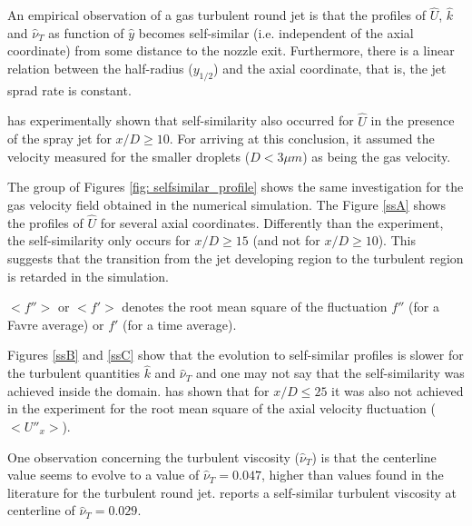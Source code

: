 An empirical observation of a gas turbulent round jet is that the profiles of $\hat{U}$, $\hat{k}$ and $\hat{\nu}_T$ as function of $\hat{y}$ becomes self-similar (i.e. independent of the axial coordinate) from some distance to the nozzle exit.
Furthermore, there is a linear relation between the half-radius ($y_{1/2}$) and the axial coordinate, that is, the jet sprad rate is constant.

\cite{chen} has experimentally shown that self-similarity also occurred for $\hat{U}$ in the presence of the spray jet for $x/D \ge 10$. For arriving at this conclusion, it assumed the velocity measured for the smaller droplets ($D<3\mu m$) as being the gas velocity. 

The group of Figures \ref{fig: selfsimilar_profile} shows the same investigation for the gas velocity field obtained in the numerical simulation. The Figure \ref{ssA} shows the profiles of $\hat{U}$ for several axial coordinates. Differently than the experiment, the self-similarity only occurs for $x/D \ge 15$ (and not for $x/D \ge 10$). This suggests that the transition from the jet developing region to the turbulent region is retarded in the simulation.

\begin{notation}
$<f''>$ or $<f'>$ denotes the root mean square of the fluctuation $f''$ (for a Favre average) or $f'$ (for a time average).
\end{notation}

Figures \ref{ssB} and \ref{ssC} show that the evolution to self-similar profiles is slower for the turbulent quantities $\hat{k}$ and $\hat{\nu}_T$ and one may not say that the self-similarity was achieved inside the domain. \cite{chen} has shown that for $x/D \le 25$ it was also not achieved in the experiment for the root mean square of the axial velocity fluctuation ($<U''_x>$). 

One observation concerning the turbulent viscosity ($\hat{\nu}_T$) is that the centerline value seems to evolve to a value of $\hat{\nu}_T = 0.047$, higher than values found in the literature for the turbulent round jet. \cite{pope2000turbulent} reports a self-similar turbulent viscosity at centerline of $\hat{\nu}_T = 0.029$.



